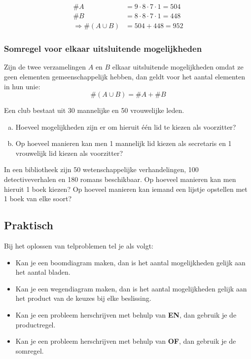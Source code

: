 \documentclass[12pt,a4paper,twoside]{article}
\begin{document}
\begin{align*}
\#A &= 9 \cdot 8 \cdot 7 \cdot 1 = 504\\
\#B &= 8 \cdot 8 \cdot 7 \cdot 1 = 448\\
\Rightarrow \#(A \cup B) &= 504 + 448 = 952
\end{align*}

\needspace{3cm}
\subsubsection*{Somregel voor elkaar uitsluitende mogelijkheden}
\begin{mdframed}
Zijn de twee verzamelingen $A$ en $B$ elkaar uitsluitende mogelijkheden omdat ze geen elementen gemeenschappelijk hebben, dan geldt voor het aantal elementen in hun unie:
\[\#(A\cup B) = \#A + \#B\]
\end{mdframed}

\begin{oefening}
Een club bestaat uit 30 mannelijke en 50 vrouwelijke leden.
\begin{enumerate}[(a)]
  \item Hoeveel mogelijkheden zijn er om hieruit één lid te kiezen als voorzitter?
  \item Op hoeveel manieren kan men 1 mannelijk lid kiezen als secretaris en 1 vrouwelijk lid kiezen als voorzitter?
\end{enumerate}
\end{oefening}

\begin{oefening}
In een bibliotheek zijn 50 wetenschappelijke verhandelingen, 100 detectiveverhalen en 180 romans beschikbaar. Op hoeveel manieren kan men hieruit 1 boek kiezen? Op hoeveel manieren kan iemand een lijstje opstellen met 1 boek van elke soort?
\end{oefening}

\subsection{Praktisch}

\begin{mdframed}
Bij het oplossen van telproblemen tel je als volgt:
\begin{itemize}
  \item Kan je een boomdiagram maken, dan is het aantal mogelijkheden gelijk aan het aantal bladen.
  \item Kan je een wegendiagram maken, dan is het aantal mogelijkheden gelijk aan het product van de keuzes bij elke beslissing.
  \item Kan je een probleem herschrijven met behulp van {\bf EN}, dan gebruik je de productregel.
  \item Kan je een probleem herschrijven met behulp van {\bf OF}, dan gebruik je de somregel.
\end{itemize}
\end{mdframed}
\end{document}
